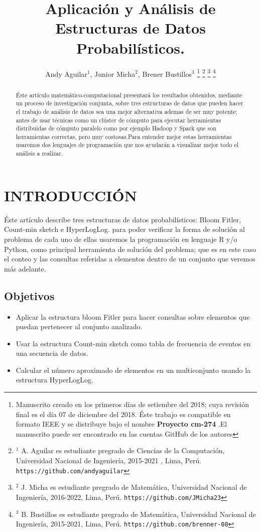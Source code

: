 \documentclass[journal]{IEEEtran}
\title{\LARGE \bf Aplicaci\'on y Análisis de Estructuras de Datos Probabil\'isticos. 
}
\author{Andy Aguilar$^{1}$, Junior Micha$^{2}$, Brener Bustillos$^{3}$%
\thanks{Manuscrito creado en los primeros d\'ias de setiembre del 2018; cuya revisi\'on final es el d\'ia 07 de diciembre del 2018. \'Este trabajo es compatible en formato IEEE y se distribuye bajo el nombre \textbf{Proyecto cm-274} .El manuscrito puede ser encontrado en las cuentas GitHub de los autores}%
\thanks{$^{1}$ A. Aguilar es estudiante pregrado de Ciencias de la Computaci\'on, Universidad Nacional de Ingenier\'ia, 2015-2021 , Lima, Per\'u.
        {\tt\small https://github.com/andyaguilar}}%
\thanks{$^{2}$ J. Micha es estudiante pregrado de Matem\'atica, Universidad Nacional de Ingenier\'ia, 2016-2022, Lima, Per\'u.
        {\tt\small https://github.com/JMicha23}}%
\thanks{$^{3}$ B. Bustillos es estudiante pregrado de Matem\'atica, Universidad Nacional de Ingenier\'ia, 2015-2021, Lima, Per\'u. 
        {\tt\small https://github.com/brenner-08}}%
}
\begin{document}
\maketitle
\thispagestyle{empty}
\pagestyle{empty}


\begin{abstract}
   
\'Este art\'iculo matem\'atico-computacional presentar\'a los resultados obtenidos, mediante un proceso de investigaci\'on conjunta, sobre tres estructuras de datos que pueden hacer el trabajo de an\'alisis de datos sea una mejor alternativa ademas de ser muy potente; antes de usar t\'ecnicas como un cl\'uster de c\'omputo para ejecutar herramientas distribuidas de c\'omputo paralelo como por ejemplo  Hadoop y Spark que son herramientas correctas, pero muy costosas.Para entender mejor estas herramientas usaremos dos lenguajes de programaci\'on que nos ayudar\'an a visualizar mejor todo el an\'alisis a realizar. 

\end{abstract}


\section{INTRODUCCI\'ON}

\'Este art\'iculo describe tres estructuras de datos probabil\'isticos: Bloom Fitler, Count-min sketch e HyperLogLog. para poder verificar la forma de soluci\'on al problema de cada uno de ellas usaremos la programaci\'on en lenguaje R y/o Python, como principal herramienta de soluci\'on del problema; que es en este caso el conteo y las consultas referidas a elementos dentro de un conjunto que veremos m\'as adelante.

\subsection{Objetivos}

\begin{itemize}
    \item Aplicar la estructura bloom Fitler para hacer consultas sobre elementos que puedan pertenecer al conjunto analizado. 
    \item Usar la estructura Count-min sketch como tabla de frecuencia de eventos en una secuencia de datos.
    \item Calcular el número aproximado de elementos en un multiconjunto usando la estructura HyperLogLog.\\ 
\end{itemize}
\end{document}
